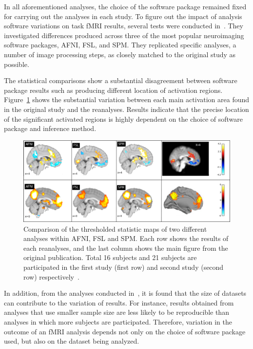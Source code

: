 In all aforementioned analyses, the choice of the software package 
remained fixed for carrying out the analyses in each study. To figure 
out the impact of analysis software variations on task fMRI results, 
several tests were conducted in~\cite{bowring2019exploring}. They 
investigated differences produced across three of the most popular 
neuroimaging software packages, AFNI, FSL, and SPM. They replicated 
specific analyses, a number of image processing steps, as closely 
matched to the original study as possible. 

The statistical comparisons show a substantial disagreement between 
software package results such as producing different location of 
activation regions. 
Figure~\ref{inter_sfw} shows the substantial variation 
between each main activation area found in the original study and the 
reanalyses. Results indicate that the precise location of the significant 
activated regions is highly dependent on the choice of software package 
and inference method.

\begin{figure}[H]
\centering
	\includegraphics[scale=0.5]{chapters/background/images/inter_sfw} 
	\caption{Comparison of the thresholded statistic maps of two 
	different analyses within AFNI, FSL and SPM. Each row shows the 
	results of each reanalyses, and the last column shows the main 
	figure from the original publication. Total 16 subjects and 21 
	subjects are participated in the first study (first row) and second 
	study (second row) respectively~\cite{bowring2019exploring}.
	\label{inter_sfw}}
\end{figure}

In addition, from the analyses conducted 
in~\cite{bowring2019exploring}, it is found that the size of datasets 
can contribute to the variation of results. For instance, results 
obtained from analyses that use smaller sample size are less likely to 
be reproducible than analyses in which more subjects are participated. 
Therefore, variation in the outcome of an fMRI analysis depends not 
only on the choice of software package used, but also on the dataset 
being analyzed. 


